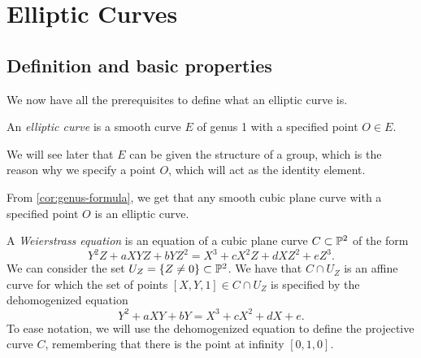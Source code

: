 \section{Elliptic Curves}

\subsection{Definition and basic properties}
\label{subs:definition-properties}

We now have all the prerequisites to define what an elliptic curve is.
\begin{definition}
	An \emph{elliptic curve} is a smooth curve $E$ of genus 1 with a specified point
	$O \in E$.
\end{definition}
We will see later that $E$ can be given the structure of a group, which is the
reason why we
specify a point $O$, which will act as the identity element.

\begin{remark}
	From \ref{cor:genus-formula}, we get that any smooth cubic
	plane curve with a specified point $O$ is an elliptic curve.
\end{remark}

A \emph{Weierstrass equation} is an equation of a 
cubic plane curve $C \subset \mathbb{P}^2$ of the form
\begin{equation*}
	Y^2Z + aXYZ + bYZ^2 = X^3 + cX^2Z + dXZ^2 + eZ^3.
\end{equation*}
We can consider the set $U_Z = \{Z \neq 0\} \subset \mathbb{P}^2$. We have that
$C \cap U_Z$ is an affine curve for which the set of points
$[X, Y, 1] \in C\cap U_Z$ is specified by the dehomogenized equation
\begin{equation*}
	Y^2 + aXY + bY = X^3 + cX^2 + dX + e.
\end{equation*}
To ease notation, we will 
use the dehomogenized equation to define the projective curve $C$,
remembering that there is the point at infinity $[0, 1, 0]$.



